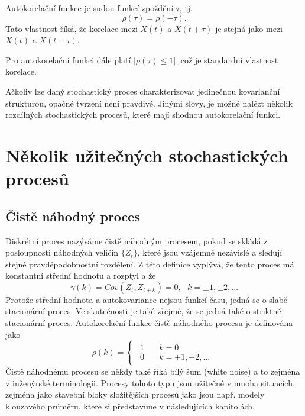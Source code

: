 Autokorelační funkce je sudou funkcí zpoždění $\tau$, tj.
\begin{equation}
\rho(\tau) = \rho(-\tau).
\end{equation}
Tato vlastnost říká, že korelace mezi $X(t)$ a $X(t + \tau)$ je stejná jako mezi $X(t)$ a $X(t - \tau)$.

Pro autokorelační funkci dále platí $|\rho(\tau) \le 1|$, což je standardní vlastnost korelace.

Ačkoliv lze daný stochastický proces charakterizovat jedinečnou kovarianční strukturou, opačné tvrzení není pravdivé. Jinými slovy, je možné nalézt několik rozdílných stochastických procesů, které mají shodnou autokorelační funkci.

\section{Několik užitečných stochastických procesů}

\subsection{Čistě náhodný proces}
Diskrétní proces nazýváme čistě náhodným procesem, pokud se skládá z posloupnosti náhodných veličin $\{Z_t\}$, které jsou vzájemně nezávislé a sledují stejné pravděpodobnostní rozdělení. Z této definice vyplývá, že tento proces má konstantní střední hodnotu a rozptyl a že
\begin{equation}
\gamma(k) = Cov(Z_t, Z_{t + k}) = 0, ~~~ k = \pm 1, \pm 2, ...
\end{equation}
Protože střední hodnota a autokovariance nejsou funkcí času, jedná se o slabě stacionární proces. Ve skutečnosti je také zřejmé, že se jedná také o striktně stacionární proces. Autokorelační funkce čistě náhodného procesu je definována jako
\begin{equation}
\rho(k) =
\begin{cases}
\begin{split}
1 & \quad k = 0\\
0 & \quad k = \pm 1, \pm 2, ...
\end{split}
\end{cases}
\end{equation}
Čistě náhodnému procesu se někdy také říká bílý šum (white noise) a to zejména v inženýrské terminologii. Procesy tohoto typu jsou užitečné v mnoha situacích, zejména jako stavební bloky složitějších procesů jako jsou např. modely klouzavého průměru, které si představíme v následujících kapitolách.

